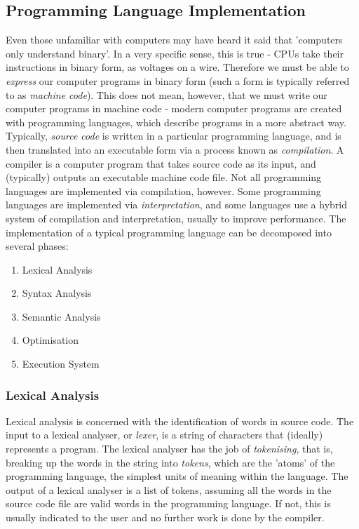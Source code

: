 \documentclass{article}
\begin{document}
\subsection{Programming Language Implementation}
Even those unfamiliar with computers may have heard it said that 'computers only understand binary'. In a very specific sense, this is true - CPUs take their instructions in binary form, as voltages on a wire. Therefore we must be able to \emph{express} our computer programs in binary form (such a form is typically referred to as \emph{machine code}). This does not mean, however, that we must write our computer programs in machine code - modern computer programs are created with programming languages, which describe programs in a more abstract way. Typically, \emph{source code} is written in a particular programming language, and is then translated into an executable form via a process known as \emph{compilation}. A compiler is a computer program that takes source code as its input, and (typically) outputs an executable machine code file. Not all programming languages are implemented via compilation, however. Some programming languages are implemented via \emph{interpretation}, and some languages use a hybrid system of compilation and interpretation, usually to improve performance. The implementation of a typical programming language can be decomposed into several phases: 
\begin{enumerate}
    \item Lexical Analysis
    \item Syntax Analysis
    \item Semantic Analysis
    \item Optimisation
    \item Execution System
\end{enumerate}

\subsubsection{Lexical Analysis}
Lexical analysis is concerned with the identification of words in source code. The input to a lexical analyser, or \emph{lexer}, is a string of characters that (ideally) represents a program. The lexical analyser has the job of \emph{tokenising}, that is, breaking up the words in the string into \emph{tokens}, which are the 'atoms' of the programming language, the simplest units of meaning within the language. The output of a lexical analyser is a list of tokens, assuming all the words in the source code file are valid words in the programming language. If not, this is usually indicated to the user and no further work is done by the compiler.
\end{document}
